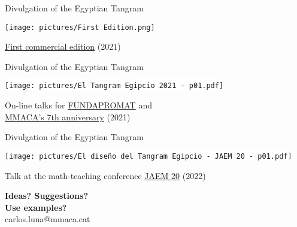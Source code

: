 \documentclass[14pt]{beamer}
\begin{document}

    \begin{frame}{Divulgation of the Egyptian Tangram}
        \begin{center}
            \texttt{[image: pictures/First Edition.png]} \\

            \smallskip

            \href{https://mmaca.cat/botiga/}{First commercial edition} (2021)
        \end{center}
    \end{frame}


    \begin{frame}{Divulgation of the Egyptian Tangram}
        \begin{center}
            \colorbox{white}{\texttt{[image: pictures/El Tangram Egipcio 2021 - p01.pdf]}} \\\medskip

            On-line talks for \href{https://www.fundapromat.org/}{FUNDAPROMAT} and\\ \href{https://www.youtube.com/watch?v=Tf-mPWFS3ik&t=7332s}{MMACA's 7th anniversary} (2021)
        \end{center}
    \end{frame}


    \begin{frame}{Divulgation of the Egyptian Tangram}
        \begin{center}
            \colorbox{white}{\texttt{[image: pictures/El diseño del Tangram Egipcio - JAEM 20 - p01.pdf]}} \\\medskip

            Talk at the math-teaching conference \href{https://20.jaem.es/}{JAEM 20} (2022)\\\phantom{()}
        \end{center}
    \end{frame}


    \begin{frame}{}
        \begin{center}
            \textbf{\huge Ideas? Suggestions?\\[0.5ex] Use examples?}\\[4ex]
            {\Large carlos.luna@mmaca.cat}
        \end{center}
    \end{frame}
\end{document}

